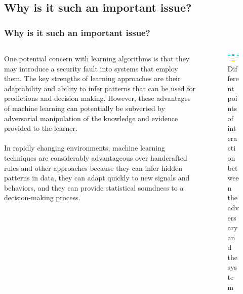 \documentclass[8pt]{beamer}
\begin{document}
\subsection{Why is it such an important issue?}
\begin{frame}
\frametitle{Why is it such an important issue?}
\begin{columns}
    \begin{column}{0.6\textwidth}
        One potential concern with learning algorithms is that they may introduce a security fault into systems that employ them. The key strengths of learning approaches are their adaptability and ability to infer patterns that can be used for predictions and decision making. However, these advantages of machine learning can potentially be subverted by adversarial manipulation of the knowledge and evidence provided to the learner.
        \\~\\
        In rapidly changing environments, machine learning techniques are considerably advantageous over handcrafted rules and other approaches because they can infer hidden patterns in data, they can adapt quickly to new signals and behaviors, and they can provide statistical soundness to a decision-making process.
    \end{column}
    \begin{column}{0.4\textwidth}
    \begin{center}
        \begin{figure} 
        \includegraphics[scale=0.25]{images/adv_cycle.jpg}
        \caption{Different points of interaction between the adversary and the system}
        \end{figure}
    \end{center}
\end{column}
\end{columns}

\end{frame}
\end{document}
